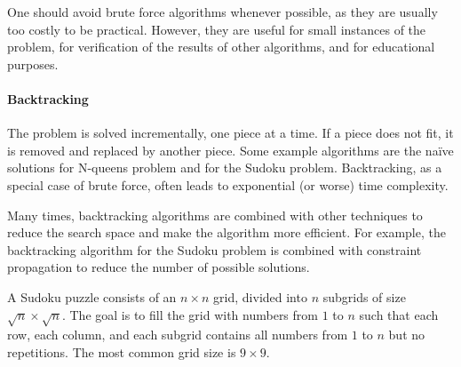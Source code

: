 One should avoid brute force algorithms whenever possible, as they are usually too costly
to be practical.  However, they are useful for small instances of the problem, for
verification of the results of other algorithms, and for educational purposes.

\paragraph{Backtracking}  The problem is solved incrementally, one piece at a time.  If a
piece does not fit, it is removed and replaced by another piece.  Some example algorithms
are the naïve solutions for N-queens problem and for the Sudoku problem.  Backtracking, as
a special case of brute force, often leads to exponential (or worse) time complexity.

Many times, backtracking algorithms are combined with other techniques to reduce the
search space and make the algorithm more efficient.  For example, the backtracking
algorithm for the Sudoku problem is combined with constraint propagation to reduce the
number of possible solutions.

A Sudoku puzzle consists of an $n \times n$ grid, divided into $n$ subgrids of size
$\sqrt{n} \times \sqrt{n}$.  The goal is to fill the grid with numbers from $1$ to $n$
such that each row, each column, and each subgrid contains all numbers from $1$ to $n$ but
no repetitions.  The most common grid size is $9 \times 9$.

